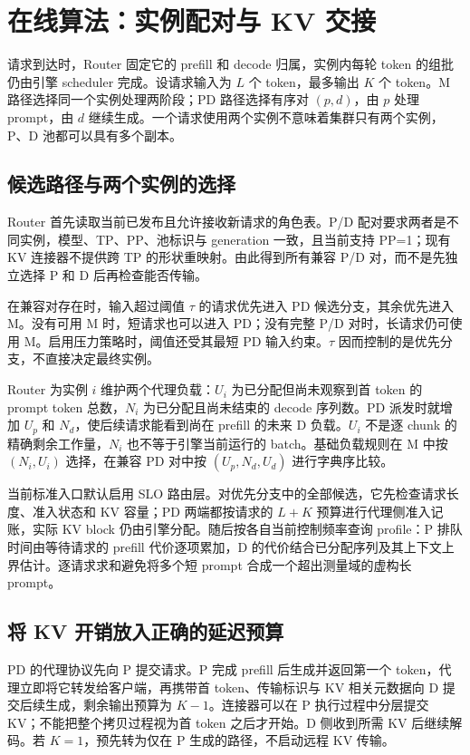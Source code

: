 \section{在线算法：实例配对与 KV 交接}
\label{sec:online}
请求到达时，Router 固定它的 prefill 和 decode 归属，实例内每轮 token 的组批仍由引擎 scheduler 完成。设请求输入为 $L$ 个 token，最多输出 $K$ 个 token。M 路径选择同一个实例处理两阶段；PD 路径选择有序对 $(p,d)$，由 $p$ 处理 prompt，由 $d$ 继续生成。一个请求使用两个实例不意味着集群只有两个实例，P、D 池都可以具有多个副本。

\subsection{候选路径与两个实例的选择}
Router 首先读取当前已发布且允许接收新请求的角色表。P/D 配对要求两者是不同实例，模型、TP、PP、池标识与 generation 一致，且当前支持 PP=1；现有 KV 连接器不提供跨 TP 的形状重映射。由此得到所有兼容 P/D 对，而不是先独立选择 P 和 D 后再检查能否传输。

在兼容对存在时，输入超过阈值 $\tau$ 的请求优先进入 PD 候选分支，其余优先进入 M。没有可用 M 时，短请求也可以进入 PD；没有完整 P/D 对时，长请求仍可使用 M。启用压力策略时，阈值还受其最短 PD 输入约束。$\tau$ 因而控制的是优先分支，不直接决定最终实例。

Router 为实例 $i$ 维护两个代理负载：$U_i$ 为已分配但尚未观察到首 token 的 prompt token 总数，$N_i$ 为已分配且尚未结束的 decode 序列数。PD 派发时就增加 $U_p$ 和 $N_d$，使后续请求能看到尚在 prefill 的未来 D 负载。$U_i$ 不是逐 chunk 的精确剩余工作量，$N_i$ 也不等于引擎当前运行的 batch。基础负载规则在 M 中按 $(N_i,U_i)$ 选择，在兼容 PD 对中按 $(U_p,N_d,U_d)$ 进行字典序比较。

当前标准入口默认启用 SLO 路由层。对优先分支中的全部候选，它先检查请求长度、准入状态和 KV 容量；PD 两端都按请求的 $L+K$ 预算进行代理侧准入记账，实际 KV block 仍由引擎分配。随后按各自当前控制频率查询 profile：P 排队时间由等待请求的 prefill 代价逐项累加，D 的代价结合已分配序列及其上下文上界估计。逐请求求和避免将多个短 prompt 合成一个超出测量域的虚构长 prompt。

\subsection{将 KV 开销放入正确的延迟预算}
PD 的代理协议先向 P 提交请求。P 完成 prefill 后生成并返回第一个 token，代理立即将它转发给客户端，再携带首 token、传输标识与 KV 相关元数据向 D 提交后续生成，剩余输出预算为 $K-1$。连接器可以在 P 执行过程中分层提交 KV；不能把整个拷贝过程视为首 token 之后才开始。D 侧收到所需 KV 后继续解码。若 $K=1$，预先转为仅在 P 生成的路径，不启动远程 KV 传输。

